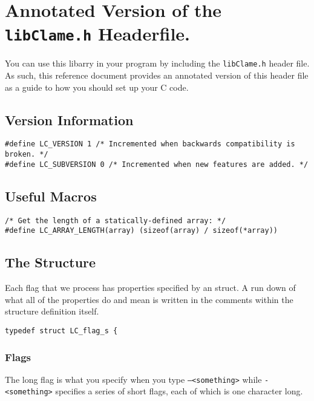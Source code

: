 \section{Annotated Version of the \texttt{libClame.h} Headerfile.}

You can use this libarry in your program by including the \texttt{libClame.h} header file. As such, this reference document provides an annotated version of this header file as a guide to how you should set up your C code.

\subsection{Version Information}

\begin{verbatim}
#define LC_VERSION 1 /* Incremented when backwards compatibility is broken. */
#define LC_SUBVERSION 0 /* Incremented when new features are added. */
\end{verbatim}

\subsection{Useful Macros}

\begin{verbatim}
/* Get the length of a statically-defined array: */
#define LC_ARRAY_LENGTH(array) (sizeof(array) / sizeof(*array))
\end{verbatim}

\subsection{The  Structure}

Each flag that we process has properties specified by an  struct. A run down of what all of the properties do and mean is written in the comments within the structure definition itself.

\begin{verbatim}
typedef struct LC_flag_s {
\end{verbatim}

\subsubsection{Flags}

The long flag is what you specify when you type \texttt{--<something>} while \texttt{-<something>} specifies a series of short flags, each of which is one character long.

